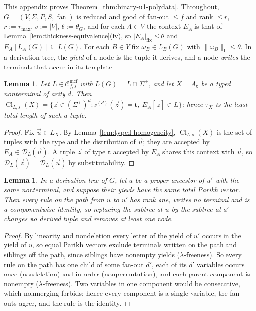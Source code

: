 \documentclass[11pt]{article}
\numberwithin{equation}{section}
\theoremstyle{plain}
\newtheorem{lemma}[theorem]{Lemma}
\theoremstyle{definition}
\theoremstyle{remark}
\newcommand{\Cmcf}[2]{\mathcal{C}^{\mathrm{mcf}}_{#1,#2}}
\newcommand{\D}{\mathcal{D}}
\newcommand{\tuple}[1]{\vec{#1}}
\newcommand{\fan}{\operatorname{fan}}
\theoremstyle{plain}
\begin{document}
This appendix proves Theorem~\ref{thm:binary-u1-polydata}.  Throughout,
$G=(V,\Sigma,P,S,\fan)$ is reduced and good of fan-out $\le f$ and rank
$\le r$, $r:=r_{\max}$, $v:=|V|$, $\theta:=\bar\theta_G$, and for each
$A\in V$ the context $E_A$ is that of Lemma~\ref{lem:thickness-equivalence}(iv),
so $|E_A|_{\mathrm{fix}}\le\theta$ and $E_A[L_A(G)]\subseteq L(G)$.  For each $B\in V$
fix $\omega_B\in L_B(G)$ with $\|\omega_B\|_1\le\theta$.  In a derivation tree, the
\emph{yield} of a node is the tuple it derives, and a node \emph{writes} the
terminals that occur in its template.

\begin{lemma}\label{lem:app-u1-fillers}
Let $L\in\Cmcf{f}{s}$ with $L(G)=L\cap\Sigma^+$, and let $X=A_{\mathbf t}$ be a typed
nonterminal of arity $d$.  Then
$\operatorname{Cl}_{L,s}(X)=\{\tuple z\in(\Sigma^+)^d:s^{(d)}(\tuple z)=\mathbf t,\
E_A[\tuple z]\in L\}$; hence $\tau_X$ is the least total length of such a tuple.
\end{lemma}

\begin{proof}
Fix $\tuple u\in L_X$.  By Lemma~\ref{lem:typed-homogeneity},
$\operatorname{Cl}_{L,s}(X)$ is the set of tuples with the type and the
distribution of $\tuple u$; they are accepted by $E_A\in\D_L(\tuple u)$.  A tuple
$\tuple z$ of type $\mathbf t$ accepted by $E_A$ shares this context with $\tuple u$,
so $\D_L(\tuple z)=\D_L(\tuple u)$ by substitutability.
\end{proof}

\begin{lemma}\label{lem:app-u1-identity}
In a derivation tree of $G$, let $u$ be a proper ancestor of $u'$ with the same
nonterminal, and suppose their yields have the same total Parikh vector.  Then
every rule on the path from $u$ to $u'$ has rank one, writes no terminal and
is a componentwise identity, so replacing the subtree at $u$ by the subtree at
$u'$ changes no derived tuple and removes at least one node.
\end{lemma}

\begin{proof}
By linearity and nondeletion every letter of the yield of $u'$ occurs in the
yield of $u$, so equal Parikh vectors exclude terminals written on the path
and siblings off the path, since siblings have nonempty yields
($\lambda$-freeness).  So every rule on the path has one child of some fan-out
$d'$, each of its $d'$ variables occurs once (nondeletion) and in order
(nonpermutation), and each parent component is nonempty ($\lambda$-freeness).
Two variables in one component would be consecutive, which nonmerging forbids;
hence every component is a single variable, the fan-outs agree, and the rule is
the identity.
\end{proof}
\end{document}
